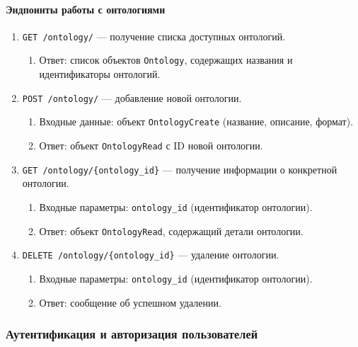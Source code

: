 \paragraph{Эндпоинты работы с онтологиями}

\begin{enumerate}
    \item \texttt{GET /ontology/} — получение списка доступных онтологий.
    \begin{enumerate}[label=\arabic{enumi}.\arabic*.]
        \item Ответ: список объектов \texttt{Ontology}, содержащих названия и идентификаторы онтологий.
    \end{enumerate}

    \item \texttt{POST /ontology/} — добавление новой онтологии.
    \begin{enumerate}[label=\arabic{enumi}.\arabic*.]
        \item Входные данные: объект \texttt{OntologyCreate} (название, описание, формат).
        \item Ответ: объект \texttt{OntologyRead} с ID новой онтологии.
    \end{enumerate}

    \item \texttt{GET /ontology/\{ontology\_id\}} — получение информации о конкретной онтологии.
    \begin{enumerate}[label=\arabic{enumi}.\arabic*.]
        \item Входные параметры: \texttt{ontology\_id} (идентификатор онтологии).
        \item Ответ: объект \texttt{OntologyRead}, содержащий детали онтологии.
    \end{enumerate}

    \item \texttt{DELETE /ontology/\{ontology\_id\}} — удаление онтологии.
    \begin{enumerate}[label=\arabic{enumi}.\arabic*.]
        \item Входные параметры: \texttt{ontology\_id} (идентификатор онтологии).
        \item Ответ: сообщение об успешном удалении.
    \end{enumerate}
\end{enumerate}

\subsubsection{Аутентификация и авторизация пользователей}

